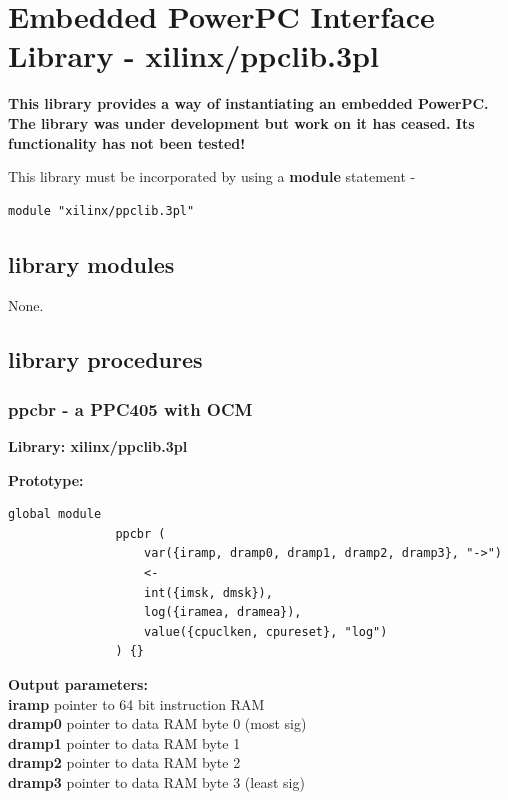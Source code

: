 \pagebreak

\section{Embedded PowerPC Interface Library - xilinx/ppclib.3pl}
\label{chap:lmppclib}

    {\bf This library provides a way of instantiating an embedded PowerPC. The
    library was under development but work on it has ceased. Its functionality has
    not been tested!}
    
    This library must be incorporated by using a {\bf module} statement -
    \begin{lstlisting}[gobble=4, language=threepl]
       module "xilinx/ppclib.3pl"
    \end{lstlisting}



    \subsection{library modules}
    
    None.



    \subsection{library procedures}

         \subsubsection{ppcbr - a PPC405 with OCM}\label{sec:lpppcbr}

            {\bf Library: xilinx/ppclib.3pl}

            {\bf Prototype:} \\
            \vsp
            \begin{lstlisting}[gobble=12, language=threepl]
               global module
               ppcbr (
                   var({iramp, dramp0, dramp1, dramp2, dramp3}, "->")
                   <-
                   int({imsk, dmsk}),
                   log({iramea, dramea}),
                   value({cpuclken, cpureset}, "log")
               ) {}
            \end{lstlisting}

            {\bf Output parameters:} \\
            {\bf iramp} pointer to 64 bit instruction RAM\\
            {\bf dramp0} pointer to data RAM byte 0 (most sig) \\
            {\bf dramp1} pointer to data RAM byte 1 \\
            {\bf dramp2} pointer to data RAM byte 2 \\
            {\bf dramp3} pointer to data RAM byte 3 (least sig)

